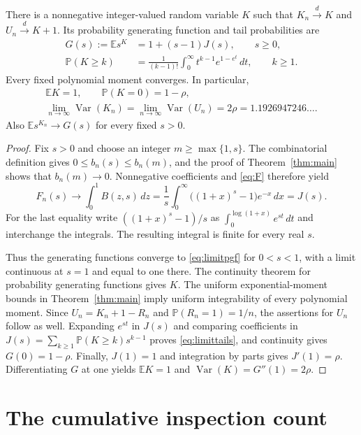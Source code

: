 \documentclass[runningheads,envcountsame,orivec]{llncs}
\newcommand{\E}{\mathbb E}
\newcommand{\PP}{\mathbb P}
\begin{document}
\begin{theorem}\label{thm:limit}
There is a nonnegative integer-valued random variable $K$ such that
$K_n\xrightarrow{d}K$ and $U_n\xrightarrow{d}K+1$. Its probability
generating function and tail probabilities are
\begin{align}
 G(s):=\E s^K&=1+(s-1)J(s),\qquad s\ge0,\label{eq:limitpgf}\\
 \PP(K\ge k)&=\frac1{(k-1)!}\int_0^\infty
          t^{k-1}e^{1-e^t}\,dt,\qquad k\ge1.\label{eq:limittails}
\end{align}
Every fixed polynomial moment converges. In particular,
\begin{gather*}
 \E K=1,\qquad \PP(K=0)=1-\rho,\\
 \lim_{n\to\infty}\operatorname{Var}(K_n)
 =\lim_{n\to\infty}\operatorname{Var}(U_n)
 =2\rho=1.1926947246\ldots.
\end{gather*}
Also $\E s^{K_n}\to G(s)$ for every fixed $s>0$.
\end{theorem}
\begin{proof}
Fix $s>0$ and choose an integer $m\ge\max\{1,s\}$. The combinatorial
definition gives $0\le b_n(s)\le b_n(m)$, and the proof of
Theorem~\ref{thm:main} shows that $b_n(m)\to0$. Nonnegative
coefficients and \eqref{eq:F} therefore yield
\[
 F_n(s)\longrightarrow\int_0^1B(z,s)\,dz
 =\frac1s\int_0^\infty\bigl((1+x)^s-1\bigr)e^{-x}\,dx=J(s).
\]
For the last equality write $((1+x)^s-1)/s$ as
$\int_0^{\log(1+x)}e^{st}\,dt$ and interchange the integrals.
The resulting integral is finite for every real $s$.

Thus the generating functions converge to \eqref{eq:limitpgf} for
$0<s<1$, with a limit continuous at $s=1$ and equal to one there.
The continuity theorem for probability generating functions gives $K$.
The uniform exponential-moment bounds in Theorem~\ref{thm:main} imply
uniform integrability of every polynomial moment. Since
$U_n=K_n+1-R_n$ and $\PP(R_n=1)=1/n$, the assertions for $U_n$ follow
as well. Expanding $e^{st}$ in $J(s)$ and comparing coefficients in
$J(s)=\sum_{k\ge1}\PP(K\ge k)s^{k-1}$ proves
\eqref{eq:limittails}, and continuity gives $G(0)=1-\rho$.
Finally, $J(1)=1$ and integration by parts gives $J'(1)=\rho$.
Differentiating $G$ at one yields $\E K=1$ and
$\operatorname{Var}(K)=G''(1)=2\rho$.
\end{proof}

\section{The cumulative inspection count}\label{sec:total}
\end{document}

